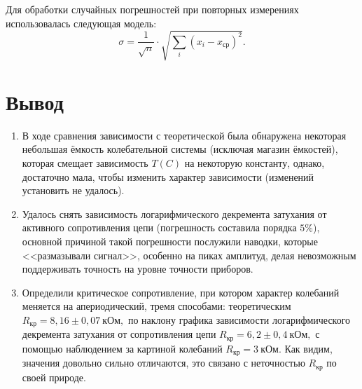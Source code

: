 \documentclass[a4paper,12pt]{extarticle}
\begin{document}
Для обработки случайных погрешностей при повторных измерениях использовалась следующая модель:
$$\sigma = \frac{1}{\sqrt{n}} \cdot \sqrt{\sum_i(x_i - x_\text{ср})^2}.$$


\section{Вывод}
\begin{enumerate}
    \item В ходе сравнения зависимости с теоретической была обнаружена некоторая небольшая ёмкость колебательной системы (исключая магазин ёмкостей), которая смещает зависимость $T(C)$ на некоторую константу, однако, достаточно мала, чтобы изменить характер зависимости (изменений установить не удалось).
    \item Удалось снять зависимость логарифмического декремента затухания от активного сопротивления цепи (погрешность составила порядка $5\%$), основной причиной такой погрешности послужили наводки, которые <<размазывали сигнал>>, особенно на пиках амплитуд, делая невозможным поддерживать точность на уровне точности приборов.
    \item Определили критическое сопротивление, при котором характер колебаний меняется на апериодический, тремя способами: теоретическим $R_\text{кр} = 8,16 \pm 0,07 \ \text{кОм},$ по наклону графика зависимости логарифмического декремента затухания от сопротивления цепи $R_\text{кр} = 6,2 \pm 0,4 \ \text{кОм},$ с помощью наблюдением за картиной колебаний $R_\text{кр} = 3 \ \text{кОм}.$ Как видим, значения довольно сильно отличаются, это связано с неточностью $R_\text{кр}$ по своей природе.


\end{enumerate}
\end{document}
